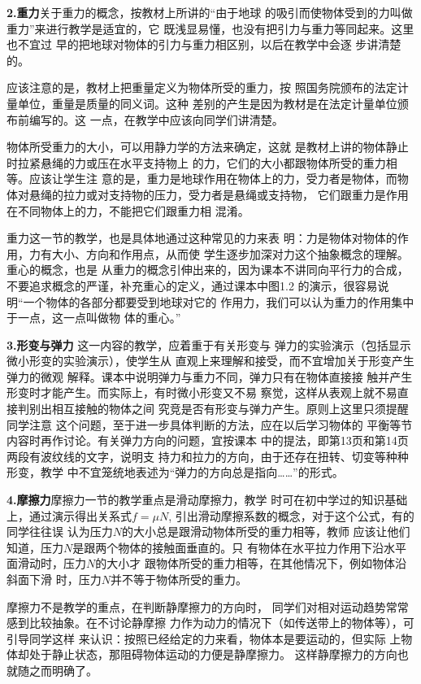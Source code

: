 \textbf{2.重力}\quad 关于重力的概念，按教材上所讲的“由于地球
的吸引而使物体受到的力叫做重力”来进行教学是适宜的，它
既浅显易懂，也没有把引力与重力等同起来。这里也不宜过
早的把地球对物体的引力与重力相区别，以后在教学中会逐
步讲清楚的。

应该注意的是，教材上把重量定义为物体所受的重力，按
照国务院颁布的法定计量单位，重量是质量的同义词。这种
差别的产生是因为教材是在法定计量单位颁布前编写的。这
一点，在教学中应该向同学们讲清楚。

物体所受重力的大小，可以用静力学的方法来确定，这就
是教材上讲的物体静止时拉紧悬绳的力或压在水平支持物上
的力，它们的大小都跟物体所受的重力相等。应该让学生注
意的是，重力是地球作用在物体上的力，受力者是物体，而物
体对悬绳的拉力或对支持物的压力，受力者是悬绳或支持物，
它们跟重力是作用在不同物体上的力，不能把它们跟重力相
混淆。

重力这一节的教学，也是具体地通过这种常见的力来表
明：力是物体对物体的作用，力有大小、方向和作用点，从而使
学生逐步加深对力这个抽象概念的理解。重心的概念，也是
从重力的概念引伸出来的，因为课本不讲同向平行力的合成，
不要追求概念的严谨，补充重心的定义，通过课本中图1.2
的演示，很容易说明“一个物体的各部分都要受到地球对它的
作用力，我们可以认为重力的作用集中于一点，这一点叫做物
体的重心。”

\textbf{3.形变与弹力}\quad
这一内容的教学，应着重于有关形变与
弹力的实验演示（包括显示微小形变的实验演示），使学生从
直观上来理解和接受，而不宜增加关于形变产生弹力的微观
解释。课本中说明弹力与重力不同，弹力只有在物体直接接
触并产生形变时才能产生。而实际上，有时微小形变又不易
察觉，这样从表观上就不易直接判别出相互接触的物体之间
究竞是否有形变与弹力产生。原则上这里只须提醒同学注意
这个问题，至于进一步具体判断的方法，应在以后学习物体的
平衡等节内容时再作讨论。有关弹力方向的问题，宜按课本
中的提法，即第13页和第14页两段有波纹线的文字，说明支
持力和拉力的方向，由于还存在扭转、切变等种种形变，教学
中不宜笼统地表述为“弹力的方向总是指向……”的形式。

\textbf{4.摩擦力}\quad 摩擦力一节的教学重点是滑动摩擦力，教学
时可在初中学过的知识基础上，通过演示得出关系式$f=\mu N$,
引出滑动摩擦系数的概念，对于这个公式，有的同学往往误
认为压力$N$的大小总是跟滑动物体所受的重力相等，教师
应该让他们知道，压力$N$是跟两个物体的接触面垂直的。只
有物体在水平拉力作用下沿水平面滑动时，压力$N$的大小才
跟物体所受的重力相等，在其他情况下，例如物体沿斜面下滑
时，压力$N$并不等于物体所受的重力。

摩擦力不是教学的重点，在判断静摩擦力的方向时，
同学们对相对运动趋势常常感到比较抽象。在不讨论静摩擦
力作为动力的情况下（如传送带上的物体等），可引导同学这样
来认识：按照已经给定的力来看，物体本是要运动的，但实际
上物体却处于静止状态，那阻碍物体运动的力便是静摩擦力。
这样静摩擦力的方向也就随之而明确了。

